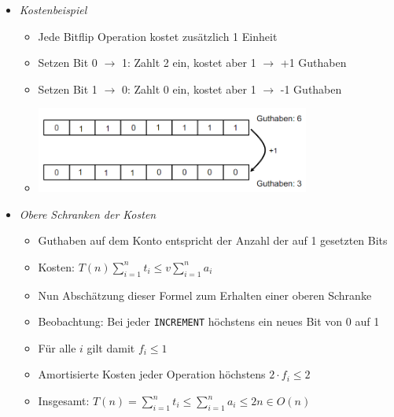 \documentclass[
    12pt,
    a4paper,
    ngerman,
    color=3b,%
    marginpar=false,
    colorback=false,
    leqno,
]{tudaexercise}
\begin{document}
\begin{itemize}
\begin{itemize}
                \item \textit{Kostenbeispiel}
                    \begin{itemize}
                        \item Jede Bitflip Operation kostet zusätzlich 1 Einheit
                        \item Setzen Bit 0 $\rightarrow$ 1: Zahlt 2 ein, kostet aber 1 $\rightarrow$ +1 Guthaben
                        \item Setzen Bit 1 $\rightarrow$ 0: Zahlt 0 ein, kostet aber 1 $\rightarrow$ -1 Guthaben
                        \item[] \includegraphics[width=9cm]{pictures/guthaben.PNG}
                    \end{itemize}
                
                \item \textit{Obere Schranken der Kosten}
                    \begin{itemize}
                        \item Guthaben auf dem Konto entspricht der Anzahl der auf 1 gesetzten Bits
                        \item Kosten: $T(n) \sum^n_{i=1} t_i \leq v\sum^n_{i=1} a_i$
                        \item Nun Abschätzung dieser Formel zum Erhalten einer oberen Schranke
                        \item Beobachtung: Bei jeder \texttt{INCREMENT} höchstens ein neues Bit von 0 auf 1
                        \item Für alle $i$ gilt damit $f_i \leq 1$
                        \item Amortisierte Kosten jeder Operation höchstens $2 \cdot f_i \leq 2$
                        \item Insgesamt: $T(n) = \sum^n_{i=1} t_i \leq \sum^n_{i=1} a_i \leq 2n \in O(n)$
                    \end{itemize}
            \end{itemize}

\pagebreak


\end{itemize}
\end{document}
